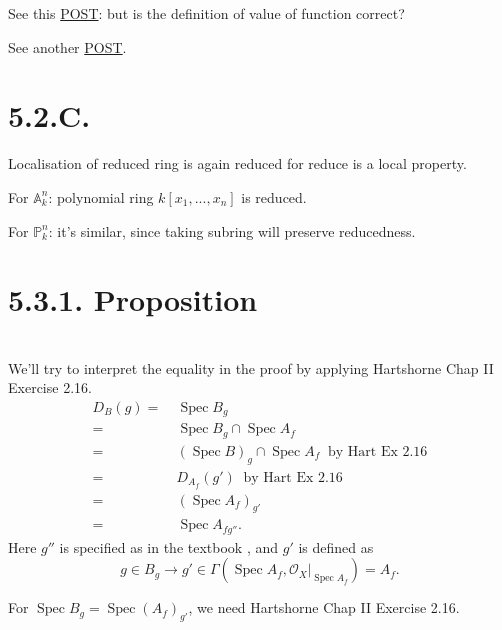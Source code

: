 See this \href{https://math.stackexchange.com/questions/3834821/equality-of-functions-in-a-reduced-scheme}{POST}: but is the definition of value of function correct?

See another \href{https://math.stackexchange.com/questions/1157904/functions-on-reduced-schemes-are-determined-by-their-values-at-each-point}{POST}.

\section{5.2.C.}

Localisation of reduced ring is again reduced for reduce is a local property. 

For $\mathbb A^n_k$: 
polynomial ring $k[x_1,...,x_n]$ is reduced.

For $\mathbb P^n_k$: it's similar, since taking subring will preserve reducedness.

\section{5.3.1. Proposition}

\section{}
We'll try to interpret the equality in the proof by applying Hartshorne \cite{hartshorne2013algebraic} Chap II Exercise 2.16.
\begin{align*}
	D_B(g)=&~ \operatorname{Spec}B_g\\
	=&~ \operatorname{Spec}B_g\cap \operatorname{Spec}A_f\\
	=&~ (\operatorname{Spec}B)_g \cap \operatorname{Spec}A_f ~\text{ by Hart Ex 2.16}\\
	=&~ D_{A_f}(g') ~\text{ by Hart Ex 2.16}\\
	=&~ (\operatorname{Spec}A_f)_{g'}\\
	=&~ \operatorname{Spec}A_{fg''}.
\end{align*}
Here $g''$ is specified as in the textbook \cite{RaviRisingSea}, and $g'$ is defined as \[g\in B_g\to g'\in\Gamma(\operatorname{Spec}A_f,\mathcal O_X\vert_{\operatorname{Spec}A_f})=A_f.\]

For $\operatorname{Spec} B_g=\operatorname{Spec}(A_f)_{g'}$, we need \cite{hartshorne2013algebraic} Hartshorne Chap II Exercise 2.16. 

\begin{comment}
See this \href{https://youtu.be/EWnhf0BdAWA?si=zMjtGhr12HSCjzNr}{VIDEO}, this \href{https://math.stackexchange.com/questions/384137/intersection-of-open-affines-can-be-covered-by-open-sets-distinguished-in-both}{POST}.

See \href{http://mathbabysteps.blogspot.com/2016/12/affine-communication-lemma.html}{POST}, \href{https://math.stackexchange.com/questions/4146296/declaremathoperator-specspecdoubt-about-nikes-lemma-about-the-intersecti}{POST}.
\end{comment}

